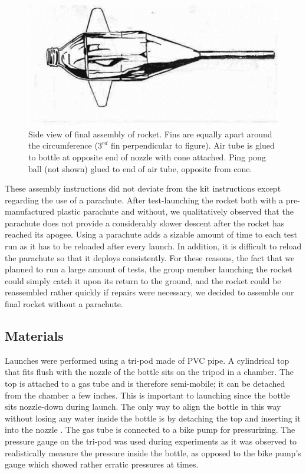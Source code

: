 \documentclass[12pt]{article}
\begin{document}
\begin{figure}[H]
\includegraphics{rocketDiagram.png}
\centering
  \caption{Side view of final assembly of rocket. Fins are equally apart around  the circumference ($3^{rd}$ fin perpendicular to figure). Air tube is glued to bottle at opposite end of nozzle with cone attached. Ping pong ball (not shown) glued to end of air tube, opposite from cone.}
\end{figure}

These assembly instructions did not deviate from the kit instructions except regarding the use of a parachute. After test-launching the rocket both with a pre-manufactured plastic parachute and without, we qualitatively observed that the parachute does not provide a considerably slower descent after the rocket has reached its apogee. Using a parachute adds a sizable amount of time to each test run as it has to be reloaded after every launch. In addition, it is difficult to reload the parachute so that it deploys consistently. For these reasons, the fact that we planned to run a large amount of tests, the group member launching the rocket could simply catch it upon its return to the ground, and the rocket could be reassembled rather quickly if repairs were necessary, we decided to assemble our final rocket without a parachute. 

  \subsection{Materials}
Launches were performed using a tri-pod made of PVC pipe. A cylindrical top that fits flush with the nozzle of the bottle sits on the tripod in a chamber. The top is attached to a gas tube and is therefore semi-mobile; it can be detached from the chamber a few inches. This is important to launching since the bottle sits nozzle-down during launch. The only way to align the bottle in this way without losing any water inside the bottle is by detaching the top and inserting it into the nozzle . The gas tube is connected to a bike pump for pressurizing. The pressure gauge on the tri-pod was used during experiments as it was observed to realistically measure the pressure inside the bottle, as opposed to the bike pump’s gauge which showed rather erratic pressures at times.
\end{document}
